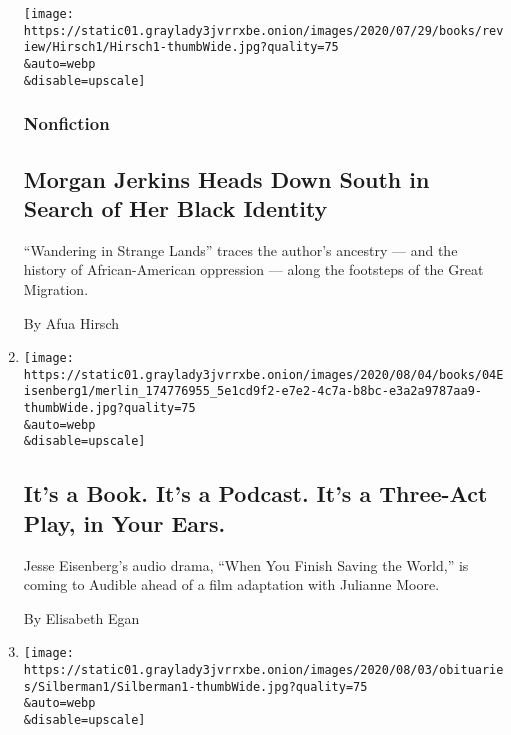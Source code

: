 \begin{enumerate}
  \texttt{[image: https://static01.graylady3jvrrxbe.onion/images/2020/07/29/books/review/Hirsch1/Hirsch1-thumbWide.jpg?quality=75\\\&auto=webp\\\&disable=upscale]}

  \hypertarget{nonfiction-1}{%
  \subsubsection{Nonfiction}\label{nonfiction-1}}

  \hypertarget{morgan-jerkins-heads-down-south-in-search-of-her-black-identity}{%
  \subsection{Morgan Jerkins Heads Down South in Search of Her Black
  Identity}\label{morgan-jerkins-heads-down-south-in-search-of-her-black-identity}}

  ``Wandering in Strange Lands'' traces the author's ancestry --- and
  the history of African-American oppression --- along the footsteps of
  the Great Migration.

  By Afua Hirsch
\item
  \href{/2020/08/02/books/jesse-eisenberg-when-you-finish-saving-the-world-audio.html}{}

  \texttt{[image: https://static01.graylady3jvrrxbe.onion/images/2020/08/04/books/04Eisenberg1/merlin\_174776955\_5e1cd9f2-e7e2-4c7a-b8bc-e3a2a9787aa9-thumbWide.jpg?quality=75\\\&auto=webp\\\&disable=upscale]}

  \hypertarget{its-a-book-its-a-podcast-its-a-three-act-play-in-your-ears}{%
  \subsection{It's a Book. It's a Podcast. It's a Three-Act Play, in
  Your
  Ears.}\label{its-a-book-its-a-podcast-its-a-three-act-play-in-your-ears}}

  Jesse Eisenberg's audio drama, ``When You Finish Saving the World,''
  is coming to Audible ahead of a film adaptation with Julianne Moore.

  By Elisabeth Egan
\item
  \href{/2020/08/01/books/james-silberman-dead.html}{}

  \texttt{[image: https://static01.graylady3jvrrxbe.onion/images/2020/08/03/obituaries/Silberman1/Silberman1-thumbWide.jpg?quality=75\\\&auto=webp\\\&disable=upscale]}

  \hypertarget{james-silberman-editor-who-nurtured-literary-careers-dies-at-93}{%
}
\end{enumerate}
